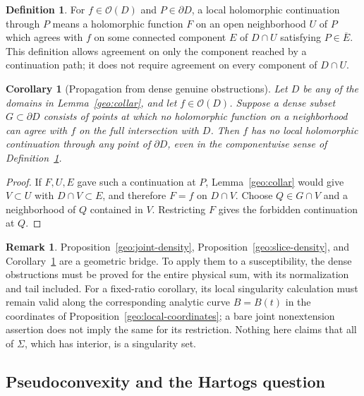 \documentclass[11pt]{article}
\numberwithin{equation}{section}
\newtheorem{corollary}[theorem]{Corollary}
\theoremstyle{definition}
\newtheorem{definition}[theorem]{Definition}
\newtheorem{remark}[theorem]{Remark}
\begin{document}
\begin{definition}\label{geo:componentwise-extension}
For \(f\in\mathcal O(D)\) and \(P\in\partial D\), a local
holomorphic continuation through \(P\) means a
holomorphic function \(F\) on an open neighborhood \(U\)
of \(P\) which agrees with \(f\) on some connected
component \(E\) of \(D\cap U\) satisfying
\(P\in\overline E\).
This definition allows agreement on only the component
reached by a continuation path; it does not require
agreement on every component of \(D\cap U\).
\end{definition}

\begin{corollary}[Propagation from dense genuine obstructions]
\label{geo:propagate-obstruction}
Let \(D\) be any of the domains in
Lemma~\ref{geo:collar}, and let \(f\in\mathcal O(D)\).
Suppose a dense subset \(G\subset\partial D\) consists
of points at which no holomorphic function on a
neighborhood can agree with \(f\) on the full
intersection with \(D\).  Then \(f\) has no local
holomorphic continuation through any point of
\(\partial D\), even in the componentwise sense of
Definition~\ref{geo:componentwise-extension}.
\end{corollary}

\begin{proof}
If \(F,U,E\) gave such a continuation at \(P\),
Lemma~\ref{geo:collar} would give \(V\subset U\)
with \(D\cap V\subset E\), and therefore \(F=f\)
on \(D\cap V\).  Choose \(Q\in G\cap V\) and a
neighborhood of \(Q\) contained in \(V\).  Restricting
\(F\) gives the forbidden continuation at \(Q\).
\end{proof}

\begin{remark}\label{geo:scope-nonextension}
Proposition~\ref{geo:joint-density},
Proposition~\ref{geo:slice-density}, and
Corollary~\ref{geo:propagate-obstruction} are a geometric
bridge.  To apply them to a susceptibility, the dense
obstructions must be proved for the entire physical sum,
with its normalization and tail included.
For a fixed-ratio corollary, its local singularity
calculation must remain valid along the corresponding
analytic curve \(B=B(t)\) in the coordinates of
Proposition~\ref{geo:local-coordinates}; a bare joint
nonextension assertion does not imply the same for
its restriction.  Nothing here claims that all of
\(\Sigma\), which has interior, is a singularity set.
\end{remark}

\subsection{Pseudoconvexity and the Hartogs question}
\label{geo:psh-section}
\end{document}
